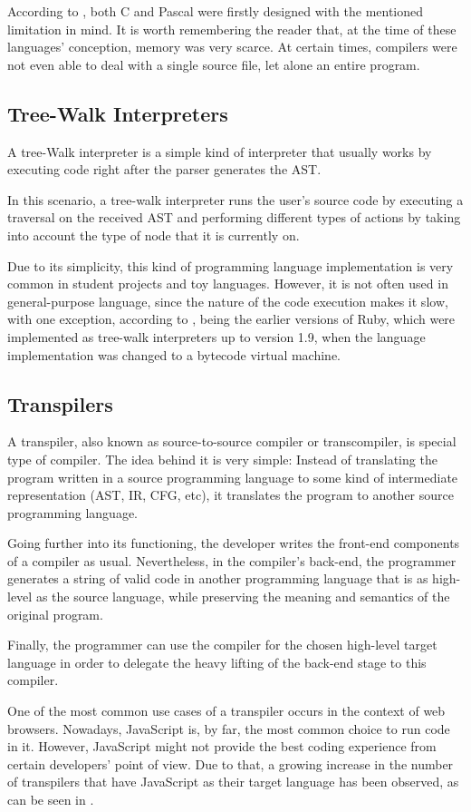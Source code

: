 According to \cite{nystrom2021crafting}, both C and Pascal were firstly designed with the mentioned limitation in mind. It is worth remembering the reader that, at the time of these languages' conception, memory was very scarce. At certain times, compilers were not even able to deal with a single source file, let alone an entire program.

\subsection{Tree-Walk Interpreters}
A tree-Walk interpreter is a simple kind of interpreter that usually works by executing code right after the parser generates the AST.

In this scenario, a tree-walk interpreter runs the user's source code by executing a traversal on the received AST and performing different types of actions by taking into account the type of node that it is currently on.

Due to its simplicity, this kind of programming language implementation is very common in student projects and toy languages. However, it is not often used in general-purpose language, since the nature of the code execution makes it slow, with one exception, according to \cite{nystrom2021crafting}, being the earlier versions of Ruby, which were implemented as tree-walk interpreters up to version 1.9, when the language implementation was changed to a bytecode virtual machine.

\subsection{Transpilers}
A transpiler, also known as source-to-source compiler or transcompiler, is special type of compiler. The idea behind it is very simple: Instead of translating the program written in a source programming language to some kind of intermediate representation (AST, IR, CFG, etc), it translates the program to another source programming language.

Going further into its functioning, the developer writes the front-end components of a compiler as usual. Nevertheless, in the compiler's back-end, the programmer generates a string of valid code in another programming language that is as high-level as the source language, while preserving the meaning and semantics of the original program.

Finally, the programmer can use the compiler for the chosen high-level target language in order to delegate the heavy lifting of the back-end stage to this compiler. 

One of the most common use cases of a transpiler occurs in the context of web browsers. Nowadays, JavaScript is, by far, the most common choice to run code in it. However, JavaScript might not provide the best coding experience from certain developers' point of view. Due to that, a growing increase in the number of transpilers that have JavaScript as their target language has been observed, as can be seen in \cite{coffeescriptCompileToJS}.
